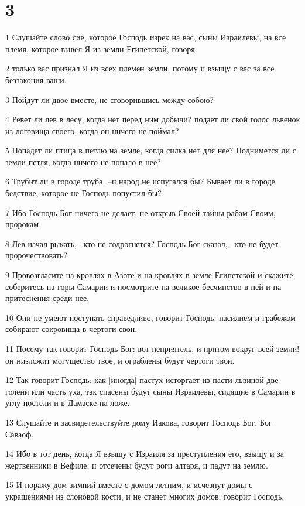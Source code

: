 \chapter{3}

\par 1 Слушайте слово сие, которое Господь изрек на вас, сыны Израилевы, на все племя, которое вывел Я из земли Египетской, говоря:
\par 2 только вас признал Я из всех племен земли, потому и взыщу с вас за все беззакония ваши.
\par 3 Пойдут ли двое вместе, не сговорившись между собою?
\par 4 Ревет ли лев в лесу, когда нет перед ним добычи? подает ли свой голос львенок из логовища своего, когда он ничего не поймал?
\par 5 Попадет ли птица в петлю на земле, когда силка нет для нее? Поднимется ли с земли петля, когда ничего не попало в нее?
\par 6 Трубит ли в городе труба, --и народ не испугался бы? Бывает ли в городе бедствие, которое не Господь попустил бы?
\par 7 Ибо Господь Бог ничего не делает, не открыв Своей тайны рабам Своим, пророкам.
\par 8 Лев начал рыкать, --кто не содрогнется? Господь Бог сказал, --кто не будет пророчествовать?
\par 9 Провозгласите на кровлях в Азоте и на кровлях в земле Египетской и скажите: соберитесь на горы Самарии и посмотрите на великое бесчинство в ней и на притеснения среди нее.
\par 10 Они не умеют поступать справедливо, говорит Господь: насилием и грабежом собирают сокровища в чертоги свои.
\par 11 Посему так говорит Господь Бог: вот неприятель, и притом вокруг всей земли! он низложит могущество твое, и ограблены будут чертоги твои.
\par 12 Так говорит Господь: как [иногда] пастух исторгает из пасти львиной две голени или часть уха, так спасены будут сыны Израилевы, сидящие в Самарии в углу постели и в Дамаске на ложе.
\par 13 Слушайте и засвидетельствуйте дому Иакова, говорит Господь Бог, Бог Саваоф.
\par 14 Ибо в тот день, когда Я взыщу с Израиля за преступления его, взыщу и за жертвенники в Вефиле, и отсечены будут роги алтаря, и падут на землю.
\par 15 И поражу дом зимний вместе с домом летним, и исчезнут домы с украшениями из слоновой кости, и не станет многих домов, говорит Господь.


